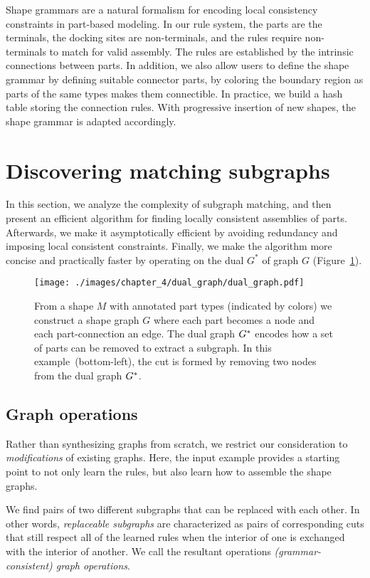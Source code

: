 Shape grammars are a natural formalism for encoding local consistency constraints in part-based modeling. In our rule system, the parts are the terminals, the docking sites are non-terminals, and the rules require non-terminals to match for valid assembly. The rules are established by the intrinsic connections between parts. In addition, we also allow users to define the shape grammar by defining suitable connector parts, by coloring the boundary region as parts of the same types makes them connectible.
In practice, we build a hash table storing the connection rules. With progressive insertion of new shapes, the shape grammar is adapted accordingly.

\section{Discovering matching subgraphs}

In this section, we analyze the complexity of subgraph matching, and then present an efficient algorithm for finding locally consistent assemblies of parts. Afterwards, we make it asymptotically efficient by avoiding redundancy and imposing local consistent constraints. Finally, we make the algorithm more concise and practically faster by operating on the dual $G^*$  of graph $G$ (Figure~\ref{fig:dual_graph}).

\begin{figure}[t!]
  \texttt{[image: ./images/chapter\_4/dual\_graph/dual\_graph.pdf]}
  \caption[Shape graph and dual shape graph.]{From a shape $M$ with annotated part types (indicated by colors) we construct a shape graph $G$ where each part becomes a node and each part-connection an edge. The dual graph $G^*$ encodes how a set of parts can be removed to extract a subgraph. In this example~(bottom-left), the cut is formed by removing two nodes from the dual graph $G^*$.
  }
  \label{fig:dual_graph}
\end{figure}

\subsection{Graph operations}

Rather than synthesizing graphs from scratch, we restrict our consideration to \emph{modifications} of existing graphs. Here, the input example provides a starting point to not only learn the rules, but also learn how to assemble the shape graphs.

 We find pairs of two different subgraphs that can be replaced with each other. In other words, \emph{replaceable subgraphs} are characterized as pairs of corresponding cuts that still respect all of the learned rules when the interior of one is exchanged with the interior of another. We call the resultant operations \emph{(grammar-consistent) graph operations}.


